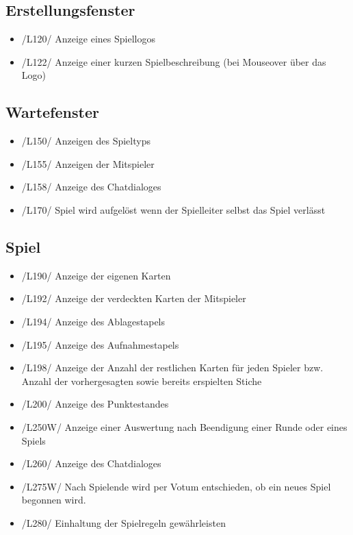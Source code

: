 \documentclass{article}
\begin{document}
\subsection{Erstellungsfenster}
\begin{itemize}
	\item /L120/ Anzeige eines Spiellogos
	\item /L122/ Anzeige einer kurzen Spielbeschreibung (bei Mouseover über das Logo)
\end{itemize}

\subsection{Wartefenster}
\begin{itemize}
	\item /L150/ Anzeigen des Spieltyps
	\item /L155/ Anzeigen der Mitspieler
	\item /L158/ Anzeige des Chatdialoges
	\item /L170/ Spiel wird aufgelöst wenn der \gls{Spielleiter} selbst das Spiel verlässt
\end{itemize}

\subsection{Spiel}
\begin{itemize}
	\item /L190/ Anzeige der eigenen Karten
	\item /L192/ Anzeige der verdeckten Karten der Mitspieler
	\item /L194/ Anzeige des Ablagestapels
	\item /L195/ Anzeige des Aufnahmestapels
	\item /L198/ Anzeige der Anzahl der restlichen Karten für jeden Spieler bzw. Anzahl der vorhergesagten sowie bereits erspielten Stiche
	\item /L200/ Anzeige des Punktestandes
	\item /L250W/ Anzeige einer Auswertung nach Beendigung einer Runde oder eines Spiels
	\item /L260/ Anzeige des Chatdialoges
	\item /L275W/ Nach Spielende wird per Votum entschieden, ob ein neues Spiel begonnen wird.
	\item /L280/ Einhaltung der Spielregeln gewährleisten
\end{itemize}
\end{document}
